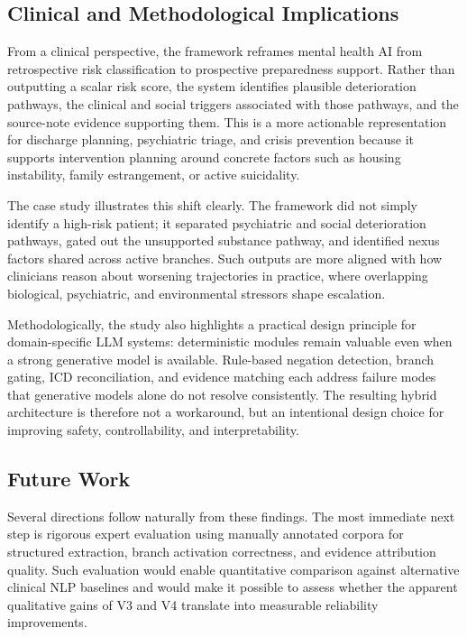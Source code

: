 \documentclass[conference]{IEEEtran}
\begin{document}
\subsection{Clinical and Methodological Implications}

From a clinical perspective, the framework reframes mental health AI from retrospective risk classification to prospective preparedness support. Rather than outputting a scalar risk score, the system identifies plausible deterioration pathways, the clinical and social triggers associated with those pathways, and the source-note evidence supporting them. This is a more actionable representation for discharge planning, psychiatric triage, and crisis prevention because it supports intervention planning around concrete factors such as housing instability, family estrangement, or active suicidality.

The case study illustrates this shift clearly. The framework did not simply identify a high-risk patient; it separated psychiatric and social deterioration pathways, gated out the unsupported substance pathway, and identified nexus factors shared across active branches. Such outputs are more aligned with how clinicians reason about worsening trajectories in practice, where overlapping biological, psychiatric, and environmental stressors shape escalation.

Methodologically, the study also highlights a practical design principle for domain-specific LLM systems: deterministic modules remain valuable even when a strong generative model is available. Rule-based negation detection, branch gating, ICD reconciliation, and evidence matching each address failure modes that generative models alone do not resolve consistently. The resulting hybrid architecture is therefore not a workaround, but an intentional design choice for improving safety, controllability, and interpretability.

\subsection{Future Work}

Several directions follow naturally from these findings. The most immediate next step is rigorous expert evaluation using manually annotated corpora for structured extraction, branch activation correctness, and evidence attribution quality. Such evaluation would enable quantitative comparison against alternative clinical NLP baselines and would make it possible to assess whether the apparent qualitative gains of V3 and V4 translate into measurable reliability improvements.
\end{document}

